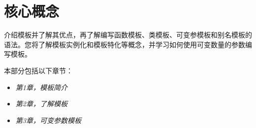 \part{核心概念}
介绍模板并了解其优点，再了解编写函数模板、类模板、可变参模板和别名模板的语法。您将了解模板实例化和模板特化等概念，并学习如何使用可变数量的参数编写模板。

本部分包括以下章节：

\begin{itemize}
  \item \textit{第1章，模板简介}
  \item \textit{第2章，了解模板}
  \item \textit{第3章，可变参数模板}
\end{itemize}



